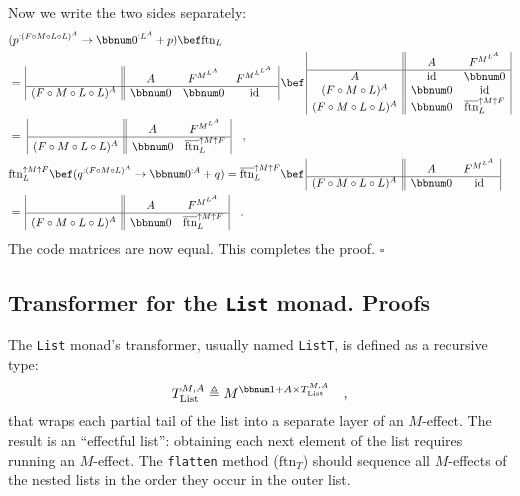 Now we write the two sides separately:
\begin{align*}
 & (p^{:(F\circ M\circ L\circ L)^{A}}\rightarrow\bbnum 0^{:L^{A}}+p)\bef\text{ftn}_{L}\\
 & =\,\begin{array}{|c||ccc|}
 & A & F^{M^{L^{A}}} & F^{M^{L^{L^{A}}}}\\
\hline (F\circ M\circ L\circ L)^{A} & \bbnum 0 & \bbnum 0 & \text{id}
\end{array}\,\bef\,\begin{array}{|c||cc|}
 & A & F^{M^{L^{A}}}\\
\hline A & \text{id} & \bbnum 0\\
(F\circ M\circ L)^{A} & \bbnum 0 & \text{id}\\
(F\circ M\circ L\circ L)^{A} & \bbnum 0 & \overline{\text{ftn}}_{L}^{\uparrow M\uparrow F}
\end{array}\\
 & =\,\,\begin{array}{|c||cc|}
 & A & F^{M^{L^{A}}}\\
\hline (F\circ M\circ L\circ L)^{A} & \bbnum 0 & \overline{\text{ftn}}_{L}^{\uparrow M\uparrow F}
\end{array}\quad,\\
 & \text{ftn}_{L}^{\uparrow M\uparrow F}\bef(q^{:(F\circ M\circ L)^{A}}\rightarrow\bbnum 0^{:A}+q)=\overline{\text{ftn}}_{L}^{\uparrow M\uparrow F}\bef\,\begin{array}{|c||cc|}
 & A & F^{M^{L^{A}}}\\
\hline (F\circ M\circ L\circ L)^{A} & \bbnum 0 & \text{id}
\end{array}\\
 & =\,\begin{array}{|c||cc|}
 & A & F^{M^{L^{A}}}\\
\hline (F\circ M\circ L\circ L)^{A} & \bbnum 0 & \overline{\text{ftn}}_{L}^{\uparrow M\uparrow F}
\end{array}\quad.
\end{align*}
The code matrices are now equal. This completes the proof. $\square$

\subsection{Transformer for the \texttt{List} monad. Proofs\label{subsec:Transformer-for-the-List-monad}}

The \lstinline!List! monad\textsf{'}s transformer, usually named \lstinline!ListT!,
is defined as a recursive type:
\[
T_{\text{List}}^{M,A}\triangleq M^{\bbnum 1+A\times T_{\text{List}}^{M,A}}\quad,
\]
that wraps each partial tail of the list into a separate layer of
an $M$-effect. The result is an \textsf{``}effectful list\textsf{''}: obtaining each
next element of the list requires running an $M$-effect. The \lstinline!flatten!
method ($\text{ftn}_{T}$) should sequence all $M$-effects of the
nested lists in the order they occur in the outer list.

